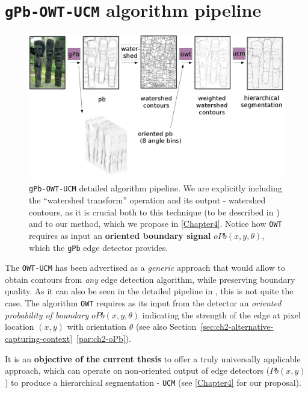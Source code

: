 \section{{\tt gPb-OWT-UCM} algorithm pipeline}
\begin{figure}[ht!]
\centering
 \includegraphics[width=1\textwidth]{images/gPb-OWT-UCM/gPb-OWT-UCM_pipeline.png}
\caption[{\tt gPb-OWT-UCM} detailed pipeline]{{\tt gPb-OWT-UCM} detailed algorithm pipeline. We are explicitly including the ``watershed transform'' operation and its output - watershed contours, as it is crucial both to this technique (to be described in ) and to our method, which we propose in \cref{Chapter4}. Notice how {\tt OWT} requires as input an {\bf oriented boundary signal} $oPb(x,y,\theta)$, which the {\tt gPb} edge detector provides.}
\label{fig:gPb-OWT-UCM-pipeline}
\end{figure}

The {\tt OWT-UCM} has been advertised \cite{Arbelaez09} as a {\it generic} approach that would allow to obtain contours from {\it any} edge detection algorithm, while preserving boundary quality. As it can also be seen in the detailed pipeline in , this is not quite the case. %
The algorithm {\tt OWT} requires as its input from the detector %
an {\it oriented probability of boundary} $oPb(x,y,\theta)$ indicating the strength of the edge at pixel location $(x,y)$ with orientation $\theta$ (see also Section~\ref*{sec:ch2-alternative-capturing-context}~\ref{par:ch2-oPb}).

It is an {\bf objective of the current thesis} to offer a truly universally applicable approach, which can operate on non-oriented output of edge detectors ($Pb(x,y)$) to produce a hierarchical segmentation - {\tt UCM} (see \cref{Chapter4} for %
our proposal).

